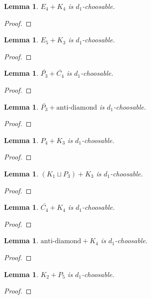 \documentclass[12pt]{article}
\theoremstyle{plain}
\newtheorem{lem}[thm]{Lemma}
\theoremstyle{definition}
\theoremstyle{remark}
\begin{document}
\begin{lem}\label{E4PlusK4}
$E_4 + K_4$ is $d_1$-choosable.
\end{lem}
\begin{proof}
\end{proof}

\begin{lem}\label{E5PlusK3}
$E_5 + K_3$ is $d_1$-choosable.
\end{lem}
\begin{proof}
\end{proof}

\begin{lem}\label{P3BarPlusC4Bar}
$\bar{P_3} + \bar{C_4}$ is $d_1$-choosable.
\end{lem}
\begin{proof}
\end{proof}

\begin{lem}\label{P3BarPlusDiamondBar}
$\bar{P_3} + \text{anti-diamond}$ is $d_1$-choosable.
\end{lem}
\begin{proof}
\end{proof}

\begin{lem}\label{P4PlusK3}
$P_4 + K_3$ is $d_1$-choosable.
\end{lem}
\begin{proof}
\end{proof}

\begin{lem}\label{K1CupP3PlusK3}
$(K_1 \sqcup P_3) + K_3$ is $d_1$-choosable.
\end{lem}
\begin{proof}
\end{proof}

\begin{lem}\label{C4BarPlusK4}
$ \bar{C_4} + K_4$ is $d_1$-choosable.
\end{lem}
\begin{proof}
\end{proof}

\begin{lem}\label{DiamondBarPlusK4}
$ \text{anti-diamond} + K_4$ is $d_1$-choosable.
\end{lem}
\begin{proof}
\end{proof}

\begin{lem}\label{K2PlusP5}
$K_2 + P_5$ is $d_1$-choosable.
\end{lem}
\begin{proof}
\end{proof}
\end{document}
